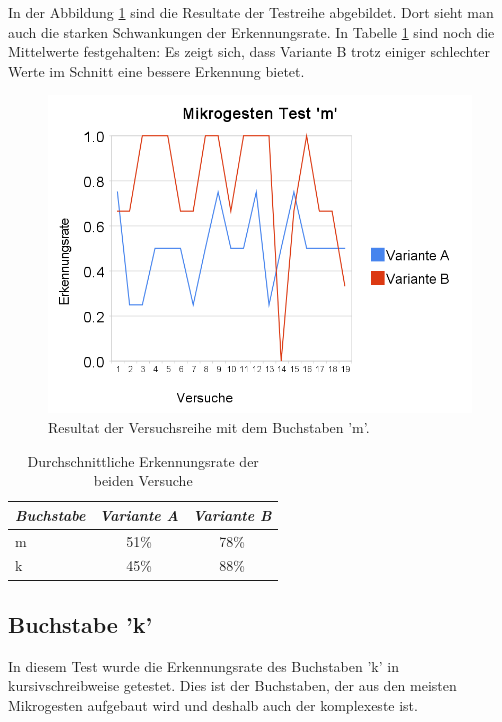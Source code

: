 In der Abbildung \ref{test_m} sind die Resultate der Testreihe abgebildet. Dort sieht man auch die starken Schwankungen der Erkennungsrate. In Tabelle \ref{test_avg} sind noch die Mittelwerte festgehalten: Es zeigt sich, dass Variante B trotz einiger schlechter Werte im Schnitt eine bessere Erkennung bietet.

\begin{figure}[h!]
  \centering
    \includegraphics[scale=0.4]{./img/mikrogesten_test_m.png}
  \caption{Resultat der Versuchsreihe mit dem Buchstaben 'm'.  }
  \label{test_m}
\end{figure}

\begin{table}[h!]
  \begin{center}
    \begin{tabular}{l | c |  c }
    \emph{Buchstabe} &  \emph{Variante A} &  \emph{Variante B} \\ \hline
    m & 51\% & 78\% \\ \hline
    k & 45\% &  88\% \\
    \end{tabular}
  \end{center}
  \caption{Durchschnittliche Erkennungsrate der beiden Versuche}
  \label{test_avg}
\end{table}

\subsection{Buchstabe 'k'}
In diesem Test wurde die Erkennungsrate des Buchstaben 'k' in kursivschreibweise getestet. Dies ist der Buchstaben, der aus den meisten Mikrogesten aufgebaut wird und deshalb auch der komplexeste ist. 

